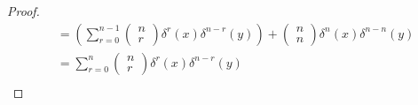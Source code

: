 \documentclass[12pt]{article}
\theoremstyle{definition}
\begin{document}
\begin{proof}
\begin{align*}
		             & = \left(\sum_{r=0}^{n-1}\begin{pmatrix}n \\ r\end{pmatrix} \delta^r(x)\delta^{n-r}(y)\right) + \begin{pmatrix} n \\ n \end{pmatrix}\delta^n(x)\delta^{n-n}(y)              \\
		             & = \sum_{r=0}^{n}\begin{pmatrix}n \\ r\end{pmatrix} \delta^r(x)\delta^{n-r}(y)                                                                                              \\
	\end{align*}
\end{proof}
\end{document}
